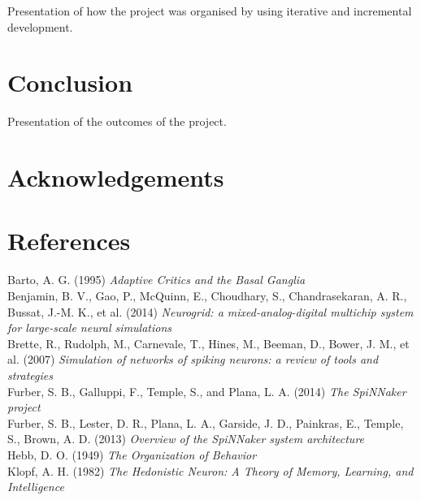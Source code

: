 \documentclass[10pt]{article}
\begin{document}
    Presentation of how the project was organised by using iterative and incremental development.
    
    \section{Conclusion}

    Presentation of the outcomes of the project.

    \section*{Acknowledgements}
    
    \onecolumn
    \newpage
    
    \section*{References}

    Barto, A. G. (1995) \textit{Adaptive Critics and the Basal Ganglia} \\[-3pt]

    \noindent
    Benjamin, B. V., Gao, P., McQuinn, E., Choudhary, S., Chandrasekaran, A. R., Bussat, J.-M. K., et al. (2014) \textit{ Neurogrid: a mixed-analog-digital multichip system for large-scale neural simulations} \\[-3pt]

    \noindent 
    Brette, R., Rudolph, M., Carnevale, T., Hines, M., Beeman, D., Bower, J. M., et al. (2007) \textit{ Simulation of networks of spiking neurons: a review of tools and strategies} \\[-3pt]

    \noindent    
    Furber, S. B., Galluppi, F., Temple, S., and Plana, L. A. (2014) \textit{The SpiNNaker project} \\[-3pt]
    
    \noindent    
    Furber, S. B., Lester, D. R., Plana, L. A., Garside, J. D., Painkras, E., Temple, S., Brown, A. D. (2013) \textit{Overview of the SpiNNaker system architecture} \\[-3pt]

    \noindent
    Hebb, D. O. (1949) \textit{The Organization of Behavior} \\[-3pt]

    \noindent    
    Klopf, A. H. (1982) \textit{The Hedonistic Neuron: A Theory of Memory, Learning, and Intelligence} \\[-3pt]
\end{document}
